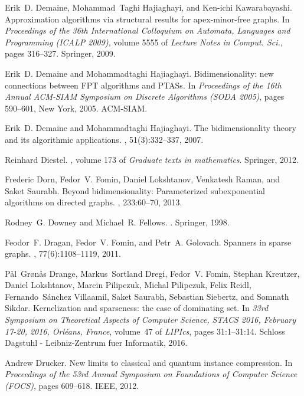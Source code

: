 \documentclass[11pt]{article}
\begin{document}
\begin{thebibliography}{10}
Erik~D. Demaine, Mohammad~Taghi Hajiaghayi, and Ken-ichi Kawarabayashi.
\newblock Approximation algorithms via structural results for apex-minor-free
  graphs.
\newblock In {\em Proceedings of the 36th International Colloquium on Automata,
  Languages and Programming (ICALP 2009)}, volume 5555 of {\em Lecture Notes in
  Comput. Sci.}, pages 316--327. Springer, 2009.

Erik~D. Demaine and Mohammadtaghi Hajiaghayi.
\newblock Bidimensionality: new connections between {FPT} algorithms and
  {PTAS}s.
\newblock In {\em Proceedings of the 16th Annual ACM-SIAM Symposium on Discrete
  Algorithms (SODA 2005)}, pages 590--601, New York, 2005. ACM-SIAM.

Erik~D. Demaine and Mohammadtaghi Hajiaghayi.
\newblock The bidimensionality theory and its algorithmic applications.
, 51(3):332--337, 2007.

Reinhard Diestel.
, volume 173 of {\em Graduate texts in
  mathematics}.
\newblock Springer, 2012.

Frederic Dorn, Fedor~V. Fomin, Daniel Lokshtanov, Venkatesh Raman, and Saket
  Saurabh.
\newblock Beyond bidimensionality: Parameterized subexponential algorithms on
  directed graphs.
, 233:60--70, 2013.

Rodney~G. Downey and Michael~R. Fellows.
.
\newblock Springer, 1998.

Feodor~F. Dragan, Fedor~V. Fomin, and Petr~A. Golovach.
\newblock Spanners in sparse graphs.
, 77(6):1108--1119, 2011.

P{\aa}l~Gr{\o}n{\aa}s Drange, Markus~Sortland Dregi, Fedor~V. Fomin, Stephan
  Kreutzer, Daniel Lokshtanov, Marcin Pilipczuk, Michal Pilipczuk, Felix Reidl,
  Fernando~S{\'{a}}nchez Villaamil, Saket Saurabh, Sebastian Siebertz, and
  Somnath Sikdar.
\newblock Kernelization and sparseness: the case of dominating set.
\newblock In {\em 33rd Symposium on Theoretical Aspects of Computer Science,
  {STACS} 2016, February 17-20, 2016, Orl{\'{e}}ans, France}, volume~47 of {\em
  LIPIcs}, pages 31:1--31:14. Schloss Dagstuhl - Leibniz-Zentrum fuer
  Informatik, 2016.

Andrew Drucker.
\newblock New limits to classical and quantum instance compression.
\newblock In {\em Proceedings of the 53rd Annual Symposium on Foundations of
  Computer Science (FOCS)}, pages 609--618. IEEE, 2012.


\end{thebibliography}
\end{document}
